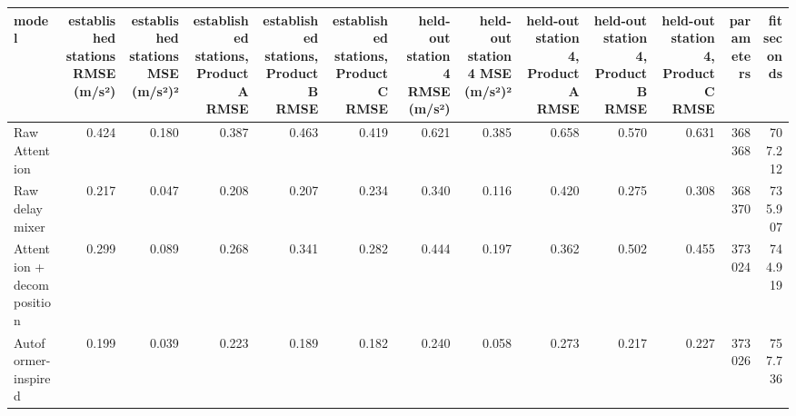 \begin{tabular}{lrrrrrrrrrrrr}
\toprule
model & established stations RMSE (m/s²) & established stations MSE (m/s²)² & established stations, Product A RMSE & established stations, Product B RMSE & established stations, Product C RMSE & held-out station 4 RMSE (m/s²) & held-out station 4 MSE (m/s²)² & held-out station 4, Product A RMSE & held-out station 4, Product B RMSE & held-out station 4, Product C RMSE & parameters & fit seconds \\
\midrule
Raw Attention & 0.424 & 0.180 & 0.387 & 0.463 & 0.419 & 0.621 & 0.385 & 0.658 & 0.570 & 0.631 & 368368 & 707.212 \\
Raw delay mixer & 0.217 & 0.047 & 0.208 & 0.207 & 0.234 & 0.340 & 0.116 & 0.420 & 0.275 & 0.308 & 368370 & 735.907 \\
Attention + decomposition & 0.299 & 0.089 & 0.268 & 0.341 & 0.282 & 0.444 & 0.197 & 0.362 & 0.502 & 0.455 & 373024 & 744.919 \\
Autoformer-inspired & 0.199 & 0.039 & 0.223 & 0.189 & 0.182 & 0.240 & 0.058 & 0.273 & 0.217 & 0.227 & 373026 & 757.736 \\
\bottomrule
\end{tabular}
